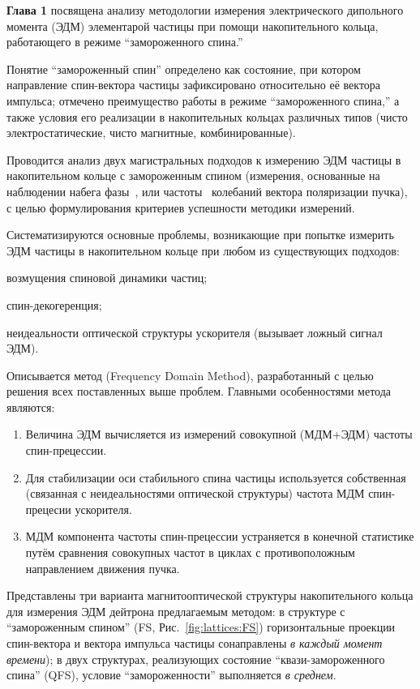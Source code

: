 
\textbf{Глава 1} посвящена анализу методологии измерения электрического дипольного момента (ЭДМ) 
элементарой частицы при помощи накопительного кольца, работающего в режиме ``замороженного спина.'' 

Понятие ``замороженный спин'' определено как состояние, при котором
направление спин-вектора частицы зафиксировано относительно её вектора импульса; 
отмечено преимущество работы в режиме ``замороженного спина,'' а также условия его реализации 
в накопительных кольцах различных типов (чисто электростатические, чисто магнитные, комбинированные).

Проводится анализ двух магистральных подходов к измерению ЭДМ частицы в накопительном кольце
с замороженным спином (измерения, основанные на наблюдении набега фазы~\cite{BNL:Deuteron2008}, 
или частоты~\cite{Koop:SpinWheel2015} колебаний вектора поляризации пучка), 
с целью формулирования критериев успешности методики измерений. 

Систематизируются основные проблемы, возникающие при попытке измерить ЭДМ частицы 
в накопительном кольце при любом из существующих подходов:
\begin{enumerate*}[(1)]
	\item возмущения спиновой динамики частиц;\label{itm:prob-smp}
	\item спин-декогеренция;\label{itm:prob-sdecoh}
	\item неидеальности оптической структуры ускорителя (вызывает ложный сигнал ЭДМ).\label{itm:prob-imp}
\end{enumerate*}

Описывается метод (Frequency Domain Method), разработанный с целью решения 
всех поставленных выше проблем. Главными особенностями метода являются:
\begin{enumerate}[(1)]
	\item Величина ЭДМ вычисляется из измерений совокупной (МДМ+ЭДМ) частоты спин-прецессии.
	\item Для стабилизации оси стабильного спина частицы используется собственная 
	(связанная с неидеальностями оптической структуры) частота МДМ спин-прецесии ускорителя.
	\item МДМ компонента частоты спин-прецессии устраняется в конечной статистике путём сравнения 
	совокупных частот в циклах с противоположным направлением движения пучка.
\end{enumerate}

Представлены три варианта магнитооптической структуры накопительного кольца 
для измерения ЭДМ дейтрона предлагаемым методом: 
в структуре с ``замороженным спином'' (FS, Рис.~\ref{fig:lattices:FS})
горизонтальные проекции спин-вектора и вектора импульса частицы 
сонаправлены \emph{в каждый момент времени});
в двух структурах,  реализующих состояние ``квази-замороженного спина'' (QFS), условие
``замороженности'' выполняется \emph{в среднем}. 

